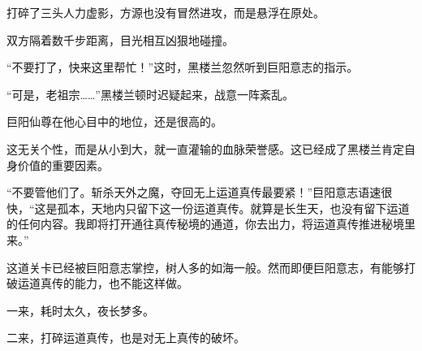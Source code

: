 \begin{this_body}
打碎了三头人力虚影，方源也没有冒然进攻，而是悬浮在原处。

双方隔着数千步距离，目光相互凶狠地碰撞。

“不要打了，快来这里帮忙！”这时，黑楼兰忽然听到巨阳意志的指示。

“可是，老祖宗……”黑楼兰顿时迟疑起来，战意一阵紊乱。

巨阳仙尊在他心目中的地位，还是很高的。

这无关个性，而是从小到大，就一直灌输的血脉荣誉感。这已经成了黑楼兰肯定自身价值的重要因素。

“不要管他们了。斩杀天外之魔，夺回无上运道真传最要紧！”巨阳意志语速很快，“这是孤本，天地内只留下这一份运道真传。就算是长生天，也没有留下运道的任何内容。我即将打开通往真传秘境的通道，你去出力，将运道真传推进秘境里来。”

这道关卡已经被巨阳意志掌控，树人多的如海一般。然而即便巨阳意志，有能够打破运道真传的能力，也不能这样做。

一来，耗时太久，夜长梦多。

二来，打碎运道真传，也是对无上真传的破坏。

\end{this_body}

